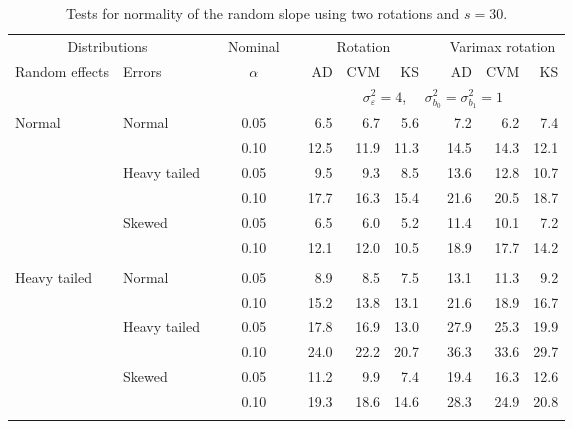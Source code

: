 \begin{table}[ht]
\caption{\label{tab:simb1s30-alt}Tests for normality of the random slope using two rotations and $s = 30$.}
\begin{scriptsize}
\begin{center}
\begin{tabular}{ll p{.1cm} c p{.1cm} rrr p{.1cm} rrr}
  \hline
  \multicolumn{2}{c}{Distributions}& & Nominal & &  \multicolumn{3}{c}{Rotation} & & \multicolumn{3}{c}{Varimax rotation} \\ \cline{1-2} \cline{6-8} \cline{10-12}   
  Random effects & Errors & & $\alpha$ & & AD & CVM & KS & & AD & CVM & KS \\ 
   \hline
& && && \multicolumn{7}{c}{$\sigma_{\varepsilon}^2 = 4$, \ \ $\sigma_{b_0}^2 = \sigma_{b_1}^2 = 1$} \\ \cline{6-12}
\rowcolor{gray!20}Normal       & Normal       && 0.05 &&   6.5 & 6.7 & 5.6 &   & 7.2 & 6.2 & 7.4 \\ 
\rowcolor{gray!20}             &              && 0.10 &&   12.5 & 11.9 & 11.3 &   & 14.5 & 14.3 & 12.1 \\ 
\rowcolor{gray!20}             & Heavy tailed && 0.05 &&   9.5 & 9.3 & 8.5 &   & 13.6 & 12.8 & 10.7 \\ 
\rowcolor{gray!20}             &              && 0.10 &&   17.7 & 16.3 & 15.4 &   & 21.6 & 20.5 & 18.7 \\ 
\rowcolor{gray!20}             & Skewed       && 0.05 &&   6.5 & 6.0 & 5.2 &   & 11.4 & 10.1 & 7.2 \\ 
\rowcolor{gray!20}             &              && 0.10 &&   12.1 & 12.0 & 10.5 &   & 18.9 & 17.7 & 14.2 \\ 
&&&&&&&&&&&\\
Heavy tailed & Normal       && 0.05 &&   8.9 & 8.5 & 7.5 &   & 13.1 & 11.3 & 9.2 \\ 
             &              && 0.10 &&   15.2 & 13.8 & 13.1 &   & 21.6 & 18.9 & 16.7 \\ 
             & Heavy tailed && 0.05 &&   17.8 & 16.9 & 13.0 &   & 27.9 & 25.3 & 19.9 \\ 
             &              && 0.10 &&   24.0 & 22.2 & 20.7 &   & 36.3 & 33.6 & 29.7 \\ 
             & Skewed       && 0.05 &&   11.2 & 9.9 & 7.4 &   & 19.4 & 16.3 & 12.6 \\ 
             &              && 0.10 &&   19.3 & 18.6 & 14.6 &   & 28.3 & 24.9 & 20.8 \\ 
&&&&&&&&&&&\\

\end{tabular}
\end{center}
\end{scriptsize}
\end{table}
